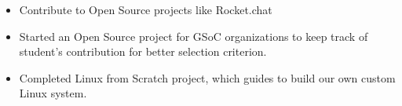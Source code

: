 
  \begin{itemize}
  \item Contribute to Open Source projects like Rocket.chat
  \item Started an Open Source project for GSoC organizations to keep track of student's contribution for better selection criterion.
  \item Completed Linux from Scratch project, which guides to build our own custom Linux system.
  \end{itemize}